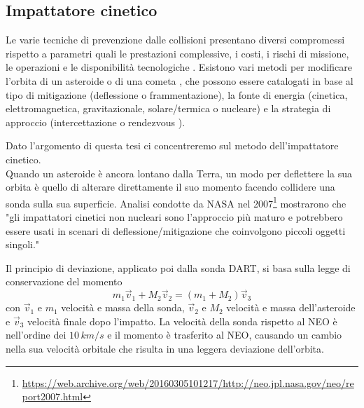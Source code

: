 \documentclass[a4paper,11pt,openright]{book}
\begin{document}
\subsection{Impattatore cinetico}
Le varie tecniche di prevenzione dalle collisioni presentano diversi compromessi rispetto a parametri quali le prestazioni complessive, i costi, i rischi di missione, le operazioni e le disponibilità tecnologiche \citep{canavan_interception_1992}. Esistono vari metodi per modificare l'orbita di un asteroide o di una cometa \citep{hall_ross_1997}, che possono essere catalogati in base al tipo di mitigazione (deflessione o frammentazione), la fonte di energia (cinetica, elettromagnetica, gravitazionale, solare/termica o nucleare) e la strategia di approccio (intercettazione o rendezvous \citep{solem_interception_1993}).

Dato l'argomento di questa tesi ci concentreremo sul metodo dell'impattatore cinetico.\\
Quando un asteroide è ancora lontano dalla Terra, un modo per deflettere la sua orbita è quello di alterare direttamente il suo momento facendo collidere una sonda sulla sua superficie. Analisi condotte da NASA nel 2007\footnote{\href{https://web.archive.org/web/20160305101217/http://neo.jpl.nasa.gov/neo/report2007.html}{https://web.archive.org/web/20160305101217/http://neo.jpl.nasa.gov/neo/report2007.html}} mostrarono che "gli impattatori cinetici non nucleari sono l'approccio più maturo e potrebbero essere usati in scenari di deflessione/mitigazione che coinvolgono piccoli oggetti singoli."

Il principio di deviazione, applicato poi dalla sonda DART, si basa sulla legge di conservazione del momento
\begin{equation}
    m_1 \vec{v}_1 + M_2\vec{v}_2 = (m_1+M_2)\vec{v}_3
\end{equation}
con $\vec{v}_1$ e $m_1$ velocità e massa della sonda, $\vec{v}_2$ e $M_2$ velocità e massa dell'asteroide e $\vec{v}_3$ velocità finale dopo l'impatto. 
La velocità della sonda rispetto al NEO è nell'ordine dei $10\,km/s$ e il momento è trasferito al NEO, causando un cambio nella sua velocità orbitale che risulta in una leggera deviazione dell'orbita.
\end{document}
